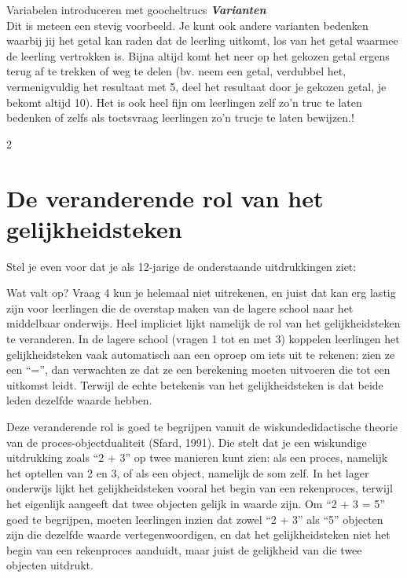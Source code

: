 \begin{lesactiviteit}{Variabelen introduceren met goocheltrucs}
\textbf{\textit{Varianten}}\\
\noindent Dit is meteen een stevig voorbeeld. Je kunt ook andere varianten bedenken waarbij jij het getal kan raden dat de leerling uitkomt, los van het getal waarmee de leerling vertrokken is. Bijna altijd komt het neer op het gekozen getal ergens terug af te trekken of weg te delen (bv. neem een getal, verdubbel het, vermenigvuldig het resultaat met 5, deel het resultaat door je gekozen getal, je bekomt altijd 10). Het is ook heel fijn om leerlingen zelf zo'n truc te laten bedenken of zelfs als toetsvraag leerlingen zo'n trucje te laten bewijzen.!

\end{lesactiviteit}
\begin{multicols}{2}

\section{De veranderende rol van het gelijkheidsteken}
Stel je even voor dat je als 12-jarige de onderstaande uitdrukkingen ziet: 
\begin{vraagenantwoord}
\end{vraagenantwoord}

Wat valt op? Vraag 4 kun je helemaal niet uitrekenen, en juist dat kan erg lastig zijn voor leerlingen die de overstap maken van de lagere school naar het middelbaar onderwijs. Heel impliciet lijkt namelijk de rol van het gelijkheidsteken te veranderen. In de lagere school (vragen 1 tot en met 3) koppelen leerlingen het gelijkheidsteken vaak automatisch aan een oproep om iets uit te rekenen: zien ze een ``='', dan verwachten ze dat ze een berekening moeten uitvoeren die tot een uitkomst leidt. Terwijl de echte betekenis van het gelijkheidsteken is dat beide leden dezelfde waarde hebben.

Deze veranderende rol is goed te begrijpen vanuit de wiskundedidactische theorie van de proces-objectdualiteit (Sfard, 1991). Die stelt dat je een wiskundige uitdrukking zoals ``2 + 3'' op twee manieren kunt zien: als een proces, namelijk het optellen van 2 en 3, of als een object, namelijk de som zelf. In het lager onderwijs lijkt het gelijkheidsteken vooral het begin van een rekenproces, terwijl het eigenlijk aangeeft dat twee objecten gelijk in waarde zijn. Om ``2 + 3 = 5'' goed te begrijpen, moeten leerlingen inzien dat zowel ``2 + 3'' als ``5'' objecten zijn die dezelfde waarde vertegenwoordigen,  en dat het gelijkheidsteken niet het begin van een rekenproces aanduidt, maar juist de gelijkheid van die twee objecten uitdrukt. 


\end{multicols}

